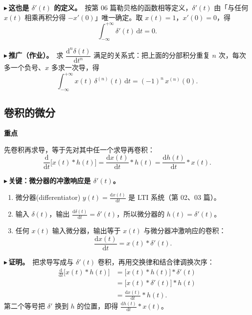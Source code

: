 \documentclass[UTF8,a4paper,11pt]{ctexart}
\newenvironment{remember}{\begin{rememberbox}\textbf{重点}\par\smallskip}{\end{rememberbox}}
\newcounter{ex}[section]
\newcommand{\point}[1]{\par\addvspace{1ex}\noindent\textcolor{ptteal}{$\blacktriangleright$\,\textbf{#1}}\ }
\begin{document}
\point{这也是 $\delta'(t)$ 的定义。}按第 06 篇勒贝格的函数相等定义，$\delta'(t)$ 由「与任何 $x(t)$ 相乘再积分得 $-x'(0)$」唯一确定。取 $x(t)=1$，$x'(0)=0$，得
\[
\int_{-\infty}^{+\infty}\delta'(t)\,\mathrm{d}t=0 .
\]
\point{推广（作业）。}求 $\dfrac{\mathrm{d}^n\delta(t)}{\mathrm{d}t^n}$ 满足的关系式：把上面的分部积分重复 $n$ 次，每次多一个负号、$x$ 多求一次导，得
\[
\int_{-\infty}^{+\infty}x(t)\,\delta^{(n)}(t)\,\mathrm{d}t=(-1)^n\,x^{(n)}(0).
\]

\subsection{卷积的微分}\label{sub:deriv}
\begin{remember}
先卷积再求导，等于先对其中任一个求导再卷积：
\[
\frac{\mathrm{d}}{\mathrm{d}t}\big[x(t)\ast h(t)\big]=\frac{\mathrm{d}x(t)}{\mathrm{d}t}\ast h(t)=\frac{\mathrm{d}h(t)}{\mathrm{d}t}\ast x(t).
\]
\end{remember}

\point{关键：微分器的冲激响应是 $\delta'(t)$。}
\begin{enumerate}[nosep]
\item 微分器(differentiator) $y(t)=\frac{\mathrm{d}x(t)}{\mathrm{d}t}$ 是 LTI 系统（第 02、03 篇）。
\item 输入 $\delta(t)$，输出 $\frac{\mathrm{d}\delta(t)}{\mathrm{d}t}=\delta'(t)$，所以微分器的 $h(t)=\delta'(t)$。
\item 任何 $x(t)$ 输入微分器，输出等于 $x(t)$ 与微分器冲激响应的卷积：
\[
\frac{\mathrm{d}x(t)}{\mathrm{d}t}=x(t)\ast\delta'(t).
\]
\end{enumerate}

\point{证明。}把求导写成与 $\delta'(t)$ 卷积，再用交换律和结合律调换次序：
\begin{align*}
\frac{\mathrm{d}}{\mathrm{d}t}\big[x(t)\ast h(t)\big]
&=\big[x(t)\ast h(t)\big]\ast\delta'(t)\\
&=\big[x(t)\ast\delta'(t)\big]\ast h(t)\\
&=\frac{\mathrm{d}x(t)}{\mathrm{d}t}\ast h(t).
\end{align*}
第二个等号把 $\delta'$ 换到 $h$ 的位置，即得 $\frac{\mathrm{d}h(t)}{\mathrm{d}t}\ast x(t)$。
\end{document}
